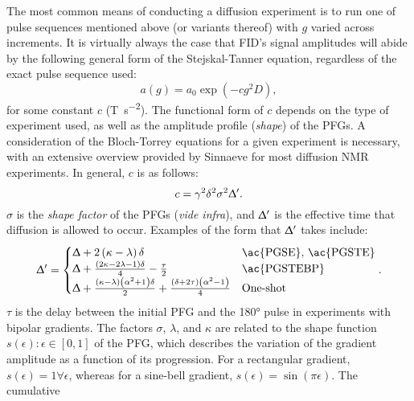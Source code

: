 The most common means of conducting a diffusion experiment is to run one of
pulse sequences mentioned above (or variants thereof) with $g$ varied across
increments.
It is virtually always the case that \ac{FID}'s signal amplitudes will
abide by the following general form of the Stejskal-Tanner equation,
regardless of the exact pulse sequence used:
\begin{equation}
    a(g) = a_0 \exp\left(- c g^2 D\right),
\end{equation}
for some constant $c$ (\unit{\tesla\per\second\squared}).
The functional form of $c$ depends on the type of experiment used, as well as
the amplitude profile (\emph{shape}) of the \acp{PFG}.
A consideration of the Bloch-Torrey equations for a given experiment is
necessary, with an extensive overview provided by Sinnaeve for most diffusion
NMR experiments\cite{Sinnaeve2012}. In general, $c$ is as follows:
\begin{equation}
    c = \gamma^2 \delta^2 \sigma^2 \Updelta^{\prime}.
    \label{eq:stejskal_tanner_generic}
\end{equation}
$\sigma$ is the \emph{shape factor} of the \acp{PFG} (\textit{vide infra}),
and $\Updelta^{\prime}$ is the effective time that diffusion is allowed
to occur. Examples of the form that $\Updelta^{\prime}$ takes include:
\begin{equation}
    \Updelta^{\prime} =
    \begin{cases}
        \Updelta + 2 \left(\kappa - \lambda\right) \delta &
        \text{\ac{PGSE}, \ac{PGSTE}}\\
        \Updelta + \frac{\left(2 \kappa - 2 \lambda - 1\right)\delta}{4} - \frac{\tau}{2} &
        \text{\ac{PGSTEBP}} \\
        \Updelta + \frac{\left(\kappa - \lambda\right)
            \left(\alpha^2 + 1\right) \delta}{2} +
        \frac{\left(\delta + 2 \tau\right)\left(\alpha^2 - 1\right)}{4} &
        \text{One-shot}
    \end{cases}.
    \label{eq:Delta-prime}
\end{equation}
$\tau$ is the delay between the initial \ac{PFG} and the \ang{180} pulse in
experiments with bipolar gradients.
The factors $\sigma$,  $\lambda$, and $\kappa$ are related to the shape
function $s(\epsilon) : \epsilon \in [0, 1]$ of the \ac{PFG}, which describes
the variation of the gradient amplitude as a function of its progression.
For a rectangular gradient, $s(\epsilon) = 1 \forall \epsilon$, whereas for a
sine-bell gradient, $s(\epsilon) = \sin(\pi \epsilon)$. The cumulative
